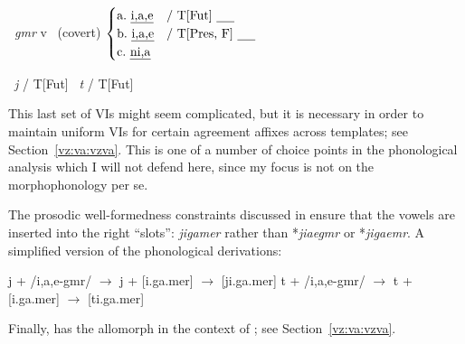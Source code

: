 \begin{exe}
\begin{xlist}
\begin{xlist}
\begin{exe}
\begin{xlist}
\begin{xlist}
\begin{exe}
\begin{xlist}
\begin{xlist}
\begin{exe}
\begin{exe}
\begin{xlist}
\begin{exe}
\begin{exe}
\begin{xlist}
\begin{exe}
\begin{exe}
\begin{exe}
\begin{exe}
\begin{exe}
\begin{xlist}
\begin{exe}
\begin{xlist}
\begin{exe}
\begin{exe}
\begin{xlist}
\begin{exe}
\begin{xlist}
\begin{exe}
\begin{xlist}
\begin{exe}
\begin{exe}
\begin{exe}
\begin{xlist}
\begin{exe}
\begin{exe}
\begin{exe}
\begin{xlist}
\begin{exe}
\begin{xlist}
\begin{exe}
\begin{xlist}
\begin{exe}
\begin{xlist}
\begin{exe}
\begin{exe}
\begin{exe}
 \begin{exe}
\ex  {} \lra~\emph{gmr} 
\ex  v \lra~(covert) 
\ex  \label{vi:vz} {\vz} \lra $\begin{cases} 
\text{a.~\emph{i,a,e}} & \text{/ T[Fut] \trace}\\
\text{b.~\emph{i,a,e}} & \text{/ T[Pres, F] \trace}\\
\text{c.~\emph{ni,a}} & \\
\end{cases}$

 \ex  
 \begin{xlist} 
 	 \lra~\emph{j} / {\trace} T[Fut] 
 	 \lra~\emph{t} / {\trace} T[Fut] 
 \z
\z 

This last set of VIs might seem complicated, but it is necessary in order to maintain uniform VIs for certain agreement affixes across templates; see Section~\ref{vz:va:vzva}. This is one of a number of choice points in the phonological analysis which I will not defend here, since my focus is not on the morphophonology per se.

The prosodic well-formedness constraints discussed in \cite{kastner18nllt} ensure that the vowels are inserted into the right ``slots'': \emph{jigamer} rather than *\emph{jiaegmr} or *\emph{jigaemr}. A simplified version of the phonological derivations:
 \begin{exe}
 \ex  
 \begin{xlist} 
 	\ex  j + /i,a,e-gmr/ $\rightarrow$ j + [i.ga.mer] $\rightarrow$ [ji.ga.mer] 
 	\ex  t + /i,a,e-gmr/ $\rightarrow$ t + [i.ga.mer] $\rightarrow$ [ti.ga.mer] 
 \z
\z 

Finally, {\vz} has the allomorph {\thit} in the context of {\va}; see Section~\ref{vz:va:vzva}.



\end{xlist}
\end{exe}
\end{xlist}
\end{exe}
\end{exe}
\end{exe}
\end{exe}
\end{xlist}
\end{exe}
\end{xlist}
\end{exe}
\end{xlist}
\end{exe}
\end{xlist}
\end{exe}
\end{exe}
\end{exe}
\end{xlist}
\end{exe}
\end{exe}
\end{exe}
\end{xlist}
\end{exe}
\end{xlist}
\end{exe}
\end{xlist}
\end{exe}
\end{exe}
\end{xlist}
\end{exe}
\end{xlist}
\end{exe}
\end{exe}
\end{exe}
\end{exe}
\end{exe}
\end{xlist}
\end{exe}
\end{exe}
\end{xlist}
\end{exe}
\end{exe}
\end{xlist}
\end{xlist}
\end{exe}
\end{xlist}
\end{xlist}
\end{exe}
\end{xlist}
\end{xlist}
\end{exe}
